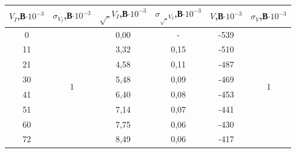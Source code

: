 \documentclass[a4paper,12pt]{report}
\begin{document}
\begin{table}[H]
\begin{tabular}{|c|c|c|c|c|c|}
\hline
$V_{I}$,В$\cdot10^{-3}$ & $\sigma_{V_I}$,В$\cdot10^{-3}$ & $\sqrt_{V_I}$,В$\cdot10^{-3}$ & $\sigma_{\sqrt_{V_I}}$,В$\cdot10^{-3}$ & $V$,В$\cdot10^{-3}$ & $\sigma_{V}$,В$\cdot10^{-3}$ \\ \hline
0                             & \multirow{13}{*}{1}                   & 0,00                              & -                                 & -539                         & \multirow{13}{*}{1}                  \\ \cline{1-1} \cline{3-5}
11                            &                                       & 3,32                              & 0,15                              & -510                         &                                      \\ \cline{1-1} \cline{3-5}
21                            &                                       & 4,58                              & 0,11                              & -487                         &                                      \\ \cline{1-1} \cline{3-5}
30                            &                                       & 5,48                              & 0,09                              & -469                         &                                      \\ \cline{1-1} \cline{3-5}
41                            &                                       & 6,40                              & 0,08                              & -453                         &                                      \\ \cline{1-1} \cline{3-5}
51                            &                                       & 7,14                              & 0,07                              & -441                         &                                      \\ \cline{1-1} \cline{3-5}
60                            &                                       & 7,75                              & 0,06                              & -430                         &                                      \\ \cline{1-1} \cline{3-5}
72                            &                                       & 8,49                              & 0,06                              & -417                         &                                      \\ \cline{1-1} \cline{3-5}

\end{tabular}
\end{table}
\end{document}
